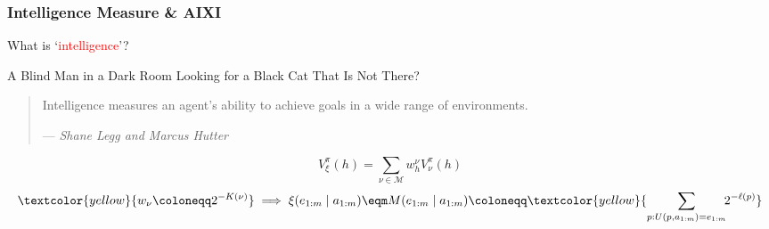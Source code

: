 \documentclass[UTF8,11pt,colorlinks,compress,openany]{beamer}%
\begin{document}
\begin{frame}\frametitle{Intelligence Measure \& AIXI}
\setlength\abovedisplayskip{0pt}
\setlength\belowdisplayskip{0pt}
	\begin{center}
		\huge What is `\textcolor{red}{intelligence}'?
	\end{center}
	\begin{center}
		A Blind Man in a Dark Room Looking for a Black Cat That Is Not There?
	\end{center}
	\begin{quote}
		Intelligence measures an agent's ability to achieve goals in a wide range of environments.\par
		\hfill --- \textsl{Shane Legg and Marcus Hutter}
	\end{quote}
	\begin{center}
	\end{center}
	\[V_\xi^\pi(h)=\sum\limits_{\nu\in\mathcal{M}}w_h^\nu V_\nu^\pi(h)\]
	\[\textcolor{yellow}{w_\nu\coloneqq 2^{-K(\nu)}}\implies\xi(e_{1:m}\mid a_{1:m})\eqm M(e_{1:m}\mid a_{1:m})\coloneqq \textcolor{yellow}{\sum\limits_{p:U(p,a_{1:m})=e_{1:m}}\!\!2^{-\ell(p)}}\]
\end{frame}
\end{document}
